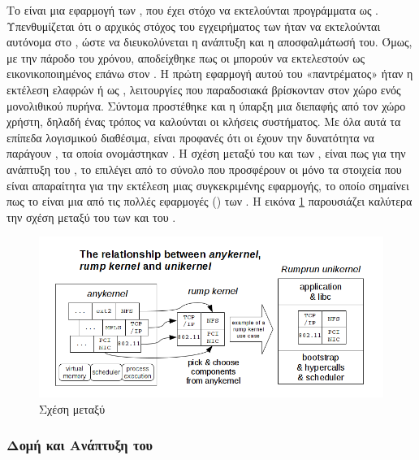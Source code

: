 Το  είναι μια εφαρμογή των , που
έχει στόχο να εκτελούνται προγράμματα ως . Υπενθυμίζεται
ότι ο αρχικός στόχος του εγχειρήματος των  ήταν
να εκτελούνται αυτόνομα  στο , ώστε να
διευκολύνεται η ανάπτυξη και η αποσφαλμάτωσή του. Όμως, με
την πάροδο του χρόνου, αποδείχθηκε πως οι  μπορούν
να εκτελεστούν ως εικονικοποιημένος  επάνω στον .
Η πρώτη εφαρμογή αυτού του «παντρέματος» ήταν η εκτέλεση ελαφρών
 ή  ως , λειτουργίες που παραδοσιακά
βρίσκονταν στον χώρο ενός μονολιθικού πυρήνα. Σύντομα προστέθηκε
και η ύπαρξη μια διεπαφής από τον χώρο χρήστη, δηλαδή ένας
τρόπος να καλούνται οι κλήσεις συστήματος\cite{RumprunXen}. Με όλα αυτά τα
επίπεδα λογισμικού διαθέσιμα, είναι προφανές ότι οι 
έχουν την δυνατότητα να παράγουν , τα οποία ονομάστηκαν
. Η σχέση μεταξύ του  και των ,
είναι πως για την ανάπτυξη του , το  επιλέγει
από το σύνολο που προσφέρουν οι  μόνο τα στοιχεία
που είναι απαραίτητα για την εκτέλεση μιας συγκεκριμένης εφαρμογής,
το οποίο σημαίνει πως το  είναι μια από τις πολλές
εφαρμογές () των . Η εικόνα \ref{fig:any_rumpk_Rumprun}
παρουσιάζει καλύτερα την σχέση μεταξύ του  των 
και του .
\newline

\begin{figure}[h]
  \includegraphics[width=\textwidth]{pictures/anykernel-rumpkernel.PNG}
  \caption{Σχέση μεταξύ }
  \label{fig:any_rumpk_Rumprun}
\end{figure}


\subsubsection{Δομή και Ανάπτυξη του }

